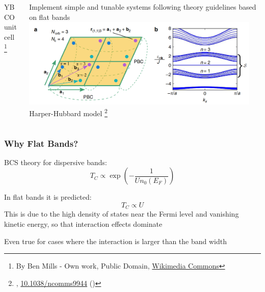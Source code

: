 \documentclass[aspectratio=169]{beamer}
\begin{document}
\begin{frame}
\begin{columns}[T]
\begin{column}{0.5\textwidth}
\begin{center}
				YBCO unit cell \footnote[frame]{By Ben Mills - Own work, Public Domain, \href{commons.wikimedia.org/w/index.php?curid=102396546}{Wikimedia Commons}}
			\end{center}
		\end{column}
		\begin{column}{0.5\textwidth}
			\begin{center}
				Implement simple and tunable systems following theory guidelines based on flat bands
				\includegraphics[width=0.95\textwidth]{figs/Lieb lattice}
				Harper-Hubbard model 	\footnote[frame]{\citeauthor{peottaSuperfluidityTopologicallyNontrivial2015}, \href{https://doi.org/10.1038/ncomms9944}{10.1038/ncomms9944} (\citeyear{peottaSuperfluidityTopologicallyNontrivial2015}) }
			\end{center}
		\end{column}
	\end{columns}
\end{frame}

\begin{frame}
	\frametitle{Why Flat Bands?}
	
	BCS theory for dispersive bands:
	\begin{equation}
		T_C \propto \exp{(- \frac{1}{U n_0 (E_F)})}
	\end{equation}
	
	In flat bands it is predicted:
	\begin{equation}
		T_C \propto U
	\end{equation}
	This is due to the high density of states near the Fermi level and vanishing kinetic energy, so that interaction effects dominate
	
	Even true for cases where the interaction is larger than the band width
\end{frame}
\end{document}

